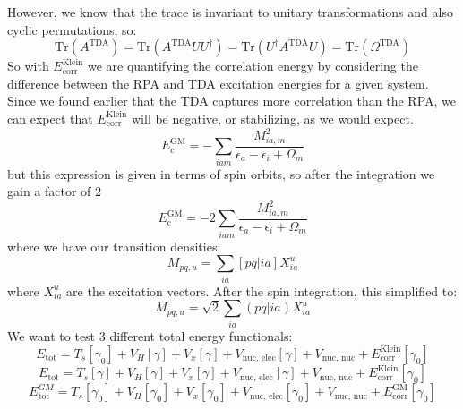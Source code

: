 \documentclass[12pt]{article}
\begin{document}
However, we know that the trace is invariant to unitary transformations and also cyclic permutations, so:
\begin{equation}
    \text{Tr} (A^{\text{TDA}}) = \text{Tr} (A^{\text{TDA}} UU^{\dagger}) = \text{Tr} (U^{\dagger} A^{\text{TDA}} U) = \text{Tr} (\Omega ^{\text{TDA}})
\end{equation}
So with $E_{\text{corr}}^{\text{Klein}}$ we are quantifying the correlation energy by considering the difference between the RPA and TDA excitation energies for a given system. Since we found earlier that the TDA captures more correlation than the RPA, we can expect that $E_{\text{corr}}^{\text{Klein}}$ will be negative, or stabilizing, as we would expect.
\begin{equation}
E_{\mathrm{c}}^{\mathrm{GM}}=-\sum_{i a m} \frac{M_{i a, m}^2}{\epsilon_a-\epsilon_i+\Omega_m}
\end{equation}
but this expression is given in terms of spin orbits, so after the integration we gain a factor of 2
\begin{equation}
E_{\mathrm{c}}^{\mathrm{GM}}=-2 \sum_{i a m} \frac{M_{i a, m}^2}{\epsilon_a-\epsilon_i+\Omega_m}
\end{equation}
where we have our transition densities:
\begin{equation}
    M_{pq,u} = \sum_{ia} [pq|ia] X_{ia}^u
\end{equation}
where $X_{ia}^u$ are the excitation vectors. After the spin integration, this simplified to:
\begin{equation}
    M_{pq,u} = \sqrt{2} \sum_{ia} (pq|ia) X_{ia}^u
\end{equation}
We want to test 3 different total energy functionals:
\begin{equation}
    E_{\text{tot}} = T_s [\gamma _{0}] + V_H [\gamma ] + V_x [\gamma ] + V_{\text{nuc, elec}} [\gamma ] + V_{\text{nuc, nuc}} + E_{\text{corr}} ^{\text{Klein}}[\gamma_0 ]
\label{eq:klein1}
\end{equation}
\begin{equation}
    E_{\text{tot}} = T_s [\gamma ] + V_H [\gamma ] + V_x [\gamma ] + V_{\text{nuc, elec}} [\gamma ] + V_{\text{nuc, nuc}} + E_{\text{corr}} ^{\text{Klein}}[\gamma_0]
\label{eq:klein2}
\end{equation}
\begin{equation}
    E_{\text{tot}}^{GM} = T_s [\gamma _{0} ] + V_H [\gamma _{0} ] + V_x [\gamma _{0} ] + V_{\text{nuc, elec}} [\gamma _{0} ] + V_{\text{nuc, nuc}} + E_{\text{corr}} ^{\text{GM}}[\gamma _{0}]
\end{equation}
\end{document}
